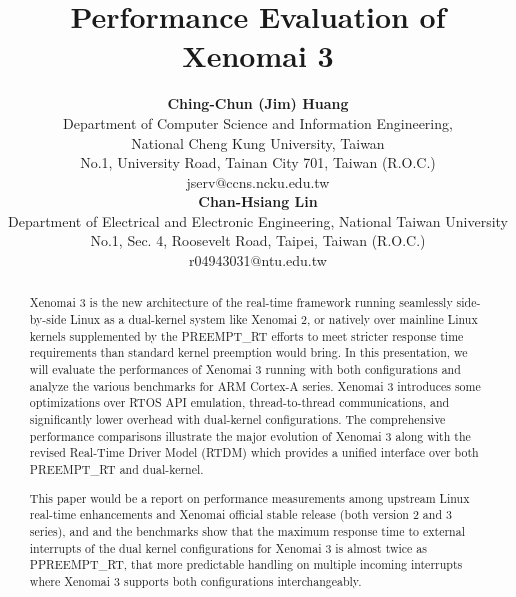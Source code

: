 \documentclass[10pt,a4paper]{article}
\title{\LARGE
Performance Evaluation of Xenomai 3
}
\author{\large
{\bf Ching-Chun (Jim) Huang }\\
Department of Computer Science and Information Engineering, \\
National Cheng Kung University, Taiwan\\
No.1, University Road, Tainan City 701, Taiwan (R.O.C.)\\
\vspace{8mm}
jserv$@$ccns.ncku.edu.tw\\
{\bf Chan-Hsiang Lin}\\
Department of Electrical and Electronic Engineering, National Taiwan University\\
No.1, Sec. 4, Roosevelt Road, Taipei, Taiwan (R.O.C.)\\
r04943031$@$ntu.edu.tw
}
\date{}
\begin{document}
\maketitle

\begin{abstract}
Xenomai 3 is the new architecture of the real-time framework running seamlessly side-by-side Linux as a dual-kernel system like Xenomai 2, or natively over mainline Linux kernels supplemented by the PREEMPT\_RT efforts to meet stricter response time requirements than standard kernel preemption would bring. In this presentation, we will evaluate the performances of Xenomai 3 running with both configurations and analyze the various benchmarks for ARM Cortex-A series. Xenomai 3 introduces some optimizations over RTOS API emulation, thread-to-thread communications, and significantly lower overhead with dual-kernel configurations. The comprehensive performance comparisons illustrate the major evolution of Xenomai 3 along with the revised Real-Time Driver Model (RTDM) which provides a unified interface over both PREEMPT\_RT and dual-kernel.

This paper would be a report on performance measurements among upstream Linux real-time enhancements and Xenomai official stable release (both version 2 and 3 series), and and the benchmarks show that the maximum response time to external interrupts of the dual kernel configurations for Xenomai 3 is almost twice as PPREEMPT\_RT, that more predictable handling on multiple incoming interrupts where Xenomai 3 supports both configurations interchangeably.
\end{abstract}

\vspace{10mm}
\end{document}
